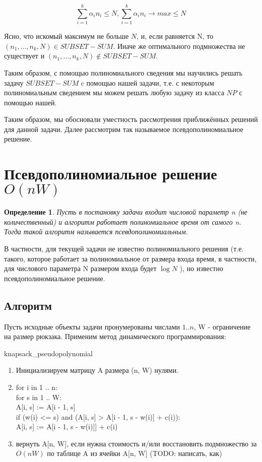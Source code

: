 \documentclass{article}
\newtheorem{definition}{Определение} %
\begin{document}
$$\sum\limits_{i = 1}^{k} {\alpha_i n_i} \leq N, \sum\limits_{i = 1}^{k} {\alpha_i n_i} \rightarrow max \leq N$$ 

Ясно, что искомый максимум не больше $N$, и, если равняется N, то $(n_1 , . . . , n_k , N ) \in SUBSET-SUM$. Иначе же оптимального подмножества не существует и $(n_1 , . . . , n_k , N ) \not\in SUBSET-SUM$.

Таким образом, с помощью полиномиального сведения мы научились решать задачу $SUBSET-SUM$ c помощью нашей задачи, т.е. с некоторым полиномиальным сведением мы можем решать любую задачу из класса $NP$ с помощью нашей.

Таким образом, мы обосновали уместность рассмотрения приближённых решений для данной задачи. Далее рассмотрим так называемое псевдополиномиальное решение. 


\section{Псевдополиномиальное решение $O(nW)$}

	\begin{definition}
		Пусть в постановку задачи входит числовой параметр n (не количественный) и алгоритм работает полиномиальное время от самого n. Тогда такой алгоритм называется псевдополиномиальным.
	\end{definition}
	В частности, для текущей задачи не известно полиномиального решения (т.е. такого, которое работает за полиномиальное от размера входа время, в частности, для числового параметра N размером входа будет $\log{N}$ ), но известно псевдополиномиальное решение.
	
	\subsection{Алгоритм}
	
	Пусть исходные объекты задачи пронумерованы числами $1..n$, W - ограничение на размер рюкзака. Применим метод динамического программирования:
	
	knapsack\_pseudopolynomial
\begin{enumerate}
	\item Инициализируем матрицу A размера (n, W) нулями.
	\item for i in 1 .. n: \\
		for s in 1 .. W: \\
		A[i, s] := A[i - 1, s] \\
		if (w(i) <= s) and (A[i, s] > A[i - 1, s - w(i)] + c(i)): \\
			A[i, s] := A[i - 1, s - w(i)]] + c(i)
	\item вернуть A[n, W], если нужна стоимость и/или восстановить подмножество за $O(nW)$ по таблице A из ячейки A[n, W] (TODO: написать, как)
	

\end{enumerate}
	
\end{document}
